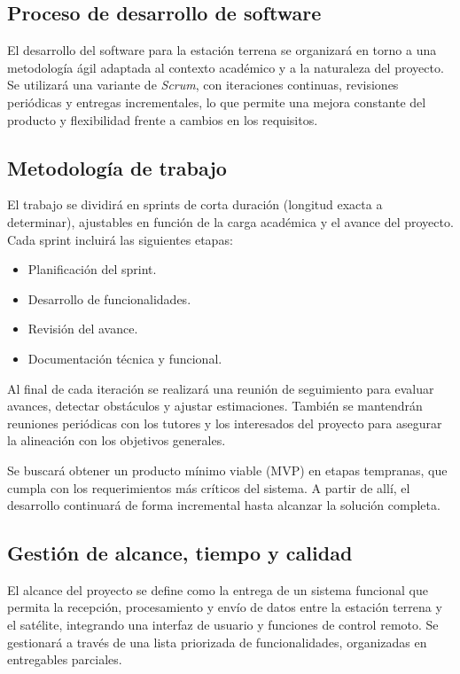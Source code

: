 \subsection*{Proceso de desarrollo de software}

El desarrollo del software para la estación terrena se organizará en torno a una metodología ágil adaptada al contexto académico y a la naturaleza del proyecto. Se utilizará una variante de \textit{Scrum}, con iteraciones continuas, revisiones periódicas y entregas incrementales, lo que permite una mejora constante del producto y flexibilidad frente a cambios en los requisitos.

\subsection*{Metodología de trabajo}

El trabajo se dividirá en sprints de corta duración (longitud exacta a determinar), ajustables en función de la carga académica y el avance del proyecto. Cada sprint incluirá las siguientes etapas:

\begin{itemize}
    \item Planificación del sprint.
    \item Desarrollo de funcionalidades.
    \item Revisión del avance.
    \item Documentación técnica y funcional.
\end{itemize}

Al final de cada iteración se realizará una reunión de seguimiento para evaluar avances, detectar obstáculos y ajustar estimaciones. También se mantendrán reuniones periódicas con los tutores y los interesados del proyecto para asegurar la alineación con los objetivos generales.

Se buscará obtener un producto mínimo viable (MVP) en etapas tempranas, que cumpla con los requerimientos más críticos del sistema. A partir de allí, el desarrollo continuará de forma incremental hasta alcanzar la solución completa.

\subsection*{Gestión de alcance, tiempo y calidad}

El alcance del proyecto se define como la entrega de un sistema funcional que permita la recepción, procesamiento y envío de datos entre la estación terrena y el satélite, integrando una interfaz de usuario y funciones de control remoto. Se gestionará a través de una lista priorizada de funcionalidades, organizadas en entregables parciales.

